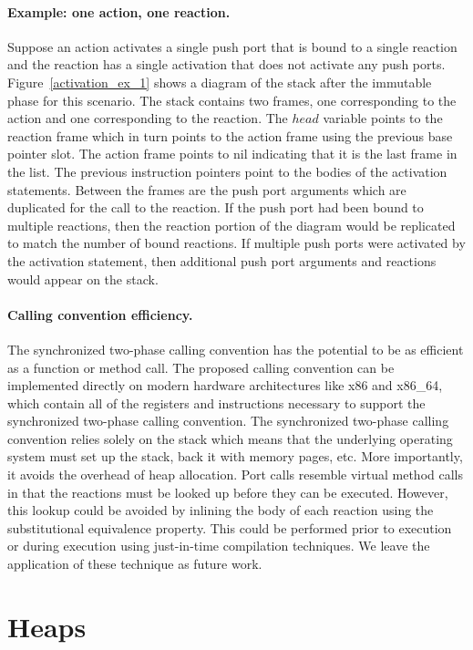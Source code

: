 \paragraph{Example:  one action, one reaction.}
Suppose an action activates a single push port that is bound to a single reaction and the reaction has a single activation that does not activate any push ports.
Figure~\ref{activation_ex_1} shows a diagram of the stack after the immutable phase for this scenario.
The stack contains two frames, one corresponding to the action and one corresponding to the reaction.
The $head$ variable points to the reaction frame which in turn points to the action frame using the previous base pointer slot.
The action frame points to nil indicating that it is the last frame in the list.
The previous instruction pointers point to the bodies of the activation statements.
Between the frames are the push port arguments which are duplicated for the call to the reaction.
If the push port had been bound to multiple reactions, then the reaction portion of the diagram would be replicated to match the number of bound reactions.
If multiple push ports were activated by the activation statement, then additional push port arguments and reactions would appear on the stack.

\paragraph{Calling convention efficiency.}
The synchronized two-phase calling convention has the potential to be as efficient as a function or method call.
The proposed calling convention can be implemented directly on modern hardware architectures like x86 and x86\_64, which contain all of the registers and instructions necessary to support the synchronized two-phase calling convention.
The synchronized two-phase calling convention relies solely on the stack which means that the underlying operating system must set up the stack, back it with memory pages, etc.
More importantly, it avoids the overhead of heap allocation.
Port calls resemble virtual method calls in that the reactions must be looked up before they can be executed.
However, this lookup could be avoided by inlining the body of each reaction using the substitutional equivalence property.
This could be performed prior to execution or during execution using just-in-time compilation techniques.
We leave the application of these technique as future work.

\section{Heaps}
\label{heaps}

